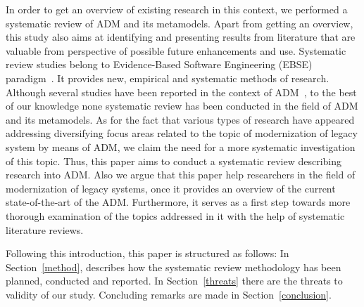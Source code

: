 In order to get an overview of existing research in this context, we performed a systematic review of ADM and its metamodels. Apart from getting an overview, this study also aims at identifying and presenting results from literature that are valuable from perspective of possible future enhancements and use. Systematic review studies belong to Evidence-Based Software Engineering (EBSE) paradigm~\cite{Kitchenham}. It provides new, empirical and systematic methods of research. Although several studies have been reported in the context of ADM~\cite{PerezCastillo20121370, SMR:SMR582, FuentesFernandez2012247, PrezCastillo2011519}, to the best of our knowledge none systematic review has been conducted in the field of ADM and its metamodels. As for the fact that various types of research have appeared addressing diversifying focus areas related to the topic of modernization of legacy system by means of ADM, we claim the need for a more systematic investigation of this topic. Thus, this paper aims to conduct a systematic review describing research into ADM. Also we argue that this paper help researchers in the field of modernization of legacy systems, once it provides an overview of the current state-of-the-art of the ADM. Furthermore, it serves as a first step towards more thorough examination of the topics addressed in it with the help of systematic literature reviews.

Following this introduction, this paper is structured as follows: In Section~\ref{method}, describes how the systematic review methodology has been planned, conducted and reported. In Section~\ref{threats} there are the threats to validity of our study. Concluding remarks are made in Section~\ref{conclusion}.